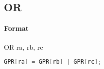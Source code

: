 \subsection{OR}


\paragraph{Format} OR ra, rb, rc

\begin{lstlisting}[language=C]
    GPR[ra] = GPR[rb] | GPR[rc];
\end{lstlisting}